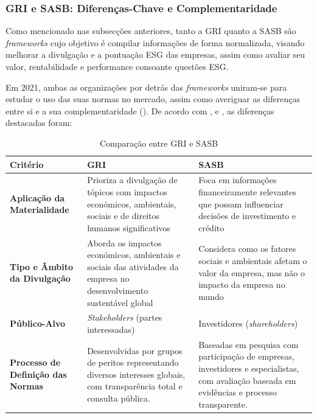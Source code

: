 
\subsubsection{GRI e SASB: Diferenças-Chave e Complementaridade}
\label{subsubsec: GRI_E_SASB}

Como mencionado nas subsecções anteriores, tanto a \gls{GRI} quanto a \gls{SASB} são \textit{frameworks} cujo objetivo é compilar informações de forma normalizada, visando melhorar a divulgação e a pontuação ESG das empresas, assim como avaliar seu valor, rentabilidade e performance consoante questões ESG.

Em 2021, ambas as organizações por detrás das \textit{frameworks} uniram-se para estudar o uso das suas normas no mercado, assim como averiguar as diferenças entre si e a sua complementaridade (\cite{GRISASB2021}). De acordo com \cite{GRISASB2021}, \cite{Pizzi2023} e \cite{Antolin-Lopez2023}, as diferenças destacadas foram:

\begin{table}[h]
    \centering
    \begin{tabular}{|p{2.5cm}|p{5.5cm}|p{5.5cm}|}
        \hline
        \textbf{Critério} & \textbf{GRI} & \textbf{SASB} \\
        \hline
        \textbf{Aplicação da Materialidade} & Prioriza a divulgação de tópicos com impactos económicos, ambientais, sociais e de direitos humanos significativos & Foca em informações financeiramente relevantes que possam influenciar decisões de investimento e crédito \\
        \hline
        \textbf{Tipo e Âmbito da Divulgação} & Aborda os impactos económicos, ambientais e sociais das atividades da empresa no desenvolvimento sustentável global & Considera como os fatores sociais e ambientais afetam o valor da empresa, mas não o impacto da empresa no mundo \\
        \hline
        \textbf{Público-Alvo} & \textit{Stakeholders} (partes interessadas) & Investidores (\textit{shareholders}) \\
        \hline
        \textbf{Processo de Definição das Normas} & Desenvolvidas por grupos de peritos representando diversos interesses globais, com transparência total e consulta pública. & Baseadas em pesquisa com participação de empresas, investidores e especialistas, com avaliação baseada em evidências e processo transparente. \\
        \hline
    \end{tabular}
    \caption{Comparação entre GRI e SASB}
    \label{tab:gri_sasb}
\end{table}

